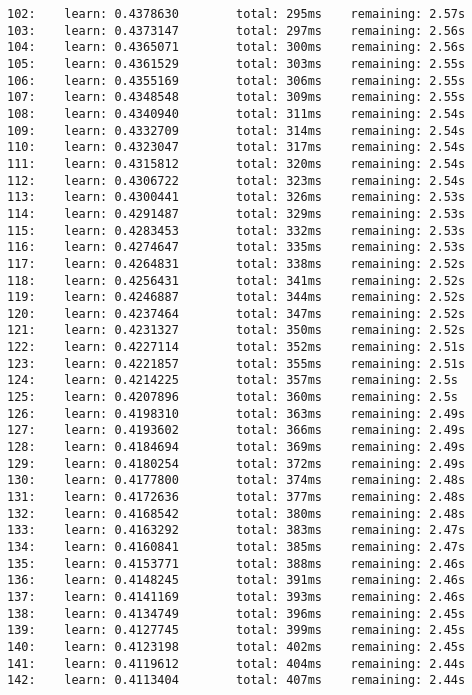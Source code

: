 \documentclass[11pt]{article}
\begin{document}
\begin{Verbatim}[commandchars=\\\{\}]
102:    learn: 0.4378630        total: 295ms    remaining: 2.57s
103:    learn: 0.4373147        total: 297ms    remaining: 2.56s
104:    learn: 0.4365071        total: 300ms    remaining: 2.56s
105:    learn: 0.4361529        total: 303ms    remaining: 2.55s
106:    learn: 0.4355169        total: 306ms    remaining: 2.55s
107:    learn: 0.4348548        total: 309ms    remaining: 2.55s
108:    learn: 0.4340940        total: 311ms    remaining: 2.54s
109:    learn: 0.4332709        total: 314ms    remaining: 2.54s
110:    learn: 0.4323047        total: 317ms    remaining: 2.54s
111:    learn: 0.4315812        total: 320ms    remaining: 2.54s
112:    learn: 0.4306722        total: 323ms    remaining: 2.54s
113:    learn: 0.4300441        total: 326ms    remaining: 2.53s
114:    learn: 0.4291487        total: 329ms    remaining: 2.53s
115:    learn: 0.4283453        total: 332ms    remaining: 2.53s
116:    learn: 0.4274647        total: 335ms    remaining: 2.53s
117:    learn: 0.4264831        total: 338ms    remaining: 2.52s
118:    learn: 0.4256431        total: 341ms    remaining: 2.52s
119:    learn: 0.4246887        total: 344ms    remaining: 2.52s
120:    learn: 0.4237464        total: 347ms    remaining: 2.52s
121:    learn: 0.4231327        total: 350ms    remaining: 2.52s
122:    learn: 0.4227114        total: 352ms    remaining: 2.51s
123:    learn: 0.4221857        total: 355ms    remaining: 2.51s
124:    learn: 0.4214225        total: 357ms    remaining: 2.5s
125:    learn: 0.4207896        total: 360ms    remaining: 2.5s
126:    learn: 0.4198310        total: 363ms    remaining: 2.49s
127:    learn: 0.4193602        total: 366ms    remaining: 2.49s
128:    learn: 0.4184694        total: 369ms    remaining: 2.49s
129:    learn: 0.4180254        total: 372ms    remaining: 2.49s
130:    learn: 0.4177800        total: 374ms    remaining: 2.48s
131:    learn: 0.4172636        total: 377ms    remaining: 2.48s
132:    learn: 0.4168542        total: 380ms    remaining: 2.48s
133:    learn: 0.4163292        total: 383ms    remaining: 2.47s
134:    learn: 0.4160841        total: 385ms    remaining: 2.47s
135:    learn: 0.4153771        total: 388ms    remaining: 2.46s
136:    learn: 0.4148245        total: 391ms    remaining: 2.46s
137:    learn: 0.4141169        total: 393ms    remaining: 2.46s
138:    learn: 0.4134749        total: 396ms    remaining: 2.45s
139:    learn: 0.4127745        total: 399ms    remaining: 2.45s
140:    learn: 0.4123198        total: 402ms    remaining: 2.45s
141:    learn: 0.4119612        total: 404ms    remaining: 2.44s
142:    learn: 0.4113404        total: 407ms    remaining: 2.44s

\end{Verbatim}
\end{document}
